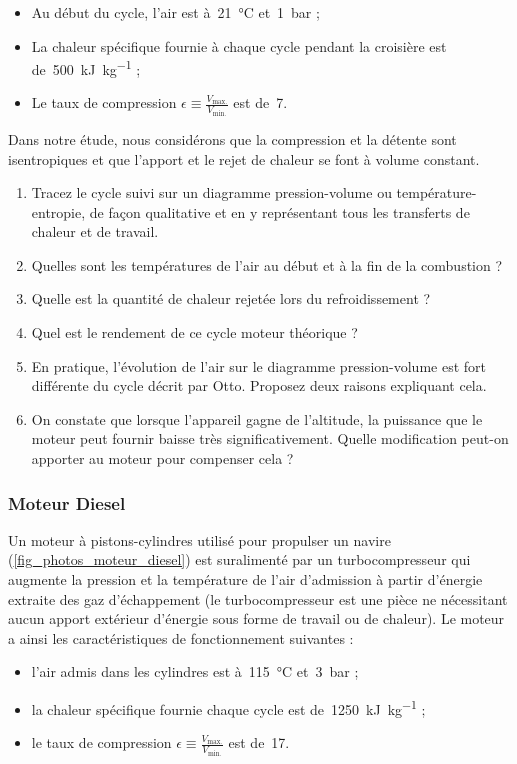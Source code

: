 	\begin{itemize}
		\item Au début du cycle, l’air est à~\SI{21}{\degreeCelsius} et~\SI{1}{\bar} ;
		\item La chaleur spécifique fournie à chaque cycle pendant la croisière est de~\SI{500}{\kilo\joule\per\kilogram} ;
		\item Le taux de compression $\epsilon \equiv \frac{V_\text{max.}}{V_\text{min.}}$ est de~\num{7}.
	\end{itemize}

	Dans notre étude, nous considérons que la compression et la détente sont isentropiques et que l’apport et le rejet de chaleur se font à volume constant.

	\begin{enumerate}
		\item Tracez le cycle suivi sur un diagramme pression-volume ou température-entropie, de façon qualitative et en y représentant tous les transferts de chaleur et de travail.
		\item Quelles sont les températures de l’air au début et à la fin de la combustion ?
		\item Quelle est la quantité de chaleur rejetée lors du refroidissement ?
		\item Quel est le rendement de ce cycle moteur théorique ?
		\item En pratique, l’évolution de l’air sur le diagramme pression-volume est fort différente du cycle décrit par Otto. Proposez deux raisons expliquant cela.
		\item On constate que lorsque l’appareil gagne de l’altitude, la puissance que le moteur peut fournir baisse très significativement. Quelle modification peut-on apporter au moteur pour compenser cela ?
	\end{enumerate}


\subsubsection{Moteur Diesel}
\label{exo_cycle_moteur_diesel}

	Un moteur à pistons-cylindres utilisé pour propulser un navire (\cref{fig_photos_moteur_diesel}) est suralimenté par un turbocompresseur qui augmente la pression et la température de l’air d’admission à partir d’énergie extraite des gaz d’échappement (le turbocompresseur est une pièce ne nécessitant aucun apport extérieur d’énergie sous forme de travail ou de chaleur). Le moteur a ainsi les caractéristiques de fonctionnement suivantes :
	\begin{itemize}
		\item l’air admis dans les cylindres est à~\SI{115}{\degreeCelsius} et~\SI{3}{\bar} ;
		\item la chaleur spécifique fournie chaque cycle est de~\SI{1250}{\kilo\joule\per\kilogram} ;
		\item le taux de compression $\epsilon \equiv \frac{V_\text{max.}}{V_\text{min.}}$ est de~\num{17}.
	\end{itemize}
	
